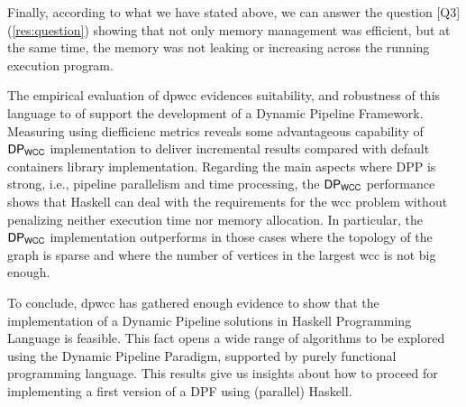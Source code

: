 Finally, according to what we have stated above, we can answer the question [Q3] (\autoref{res:question}) showing that not only memory management was efficient, but at the same time, the memory was not leaking or increasing across the running execution program.

The empirical evaluation of \acrshort{dpwcc} evidences suitability, and robustness of this language to of  support the development of a Dynamic Pipeline Framework. Measuring using diefficienc metrics reveals some advantageous capability of $\mathsf{DP_{WCC}}$ implementation to deliver incremental results compared with default containers library implementation.  Regarding the main aspects where DPP is strong, i.e., pipeline parallelism and time processing, the $\mathsf{DP_{WCC}}$ performance shows that Haskell can deal with the requirements for the \acrshort{wcc} problem without penalizing neither execution time nor memory allocation. In particular, the $\mathsf{DP_{WCC}}$ implementation outperforms in those cases where the topology of the graph is sparse and where the number of vertices in the largest \acrshort{wcc} is not big enough.  

To conclude, \acrshort{dpwcc} has gathered enough evidence to show that the implementation of a Dynamic Pipeline solutions in Haskell Programming Language is feasible. This fact opens a wide range of algorithms to be explored using the Dynamic Pipeline Paradigm, supported by purely functional programming language. This results give us insights about how to proceed for implementing a first version of a DPF using (parallel) Haskell.